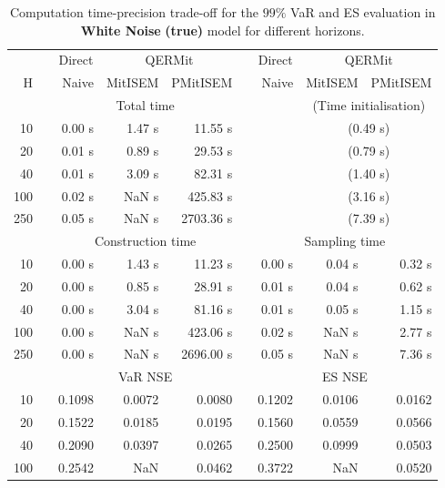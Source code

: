\footnotesize{  
{ \renewcommand{\arraystretch}{1.3} 
\begin{longtable}{rr rrr r rrr}  
\caption{Computation time-precision trade-off for the  $99\%$ VaR and ES evaluation in \textbf{White Noise} \textbf{(true)} model for different horizons.} 
\label{tab:time_precision_WN_ML} \\ 
 & & \multicolumn{1}{c}{Direct} & \multicolumn{2}{c}{QERMit}&  & \multicolumn{1}{c}{Direct} & \multicolumn{2}{c}{QERMit} \\ \cline{3-5} \cline{7-9} 
 H & & Naive & MitISEM & PMitISEM & & Naive & MitISEM & PMitISEM \\ \hline 
 & & \multicolumn{3}{c}{Total time} & & & \multicolumn{2}{c}{(Time initialisation)}  \\ \cline{3-5} \cline{8-9}
10 & & 0.00 s & 1.47 s & 11.55 s &&& \multicolumn{2}{c}{(0.49 s)} \\ 
20 & & 0.01 s & 0.89 s & 29.53 s &&& \multicolumn{2}{c}{(0.79 s)} \\ 
40 & & 0.01 s & 3.09 s & 82.31 s &&& \multicolumn{2}{c}{(1.40 s)} \\ 
100 & & 0.02 s &  NaN s & 425.83 s &&& \multicolumn{2}{c}{(3.16 s)} \\ 
250 & & 0.05 s &  NaN s & 2703.36 s &&& \multicolumn{2}{c}{(7.39 s)} \\ 
\hline 
 & & \multicolumn{3}{c}{Construction time} & & \multicolumn{3}{c}{ Sampling time} \\ \cline{3-5}  \cline{7-9}
10 & & 0.00 s & 1.43 s & 11.23 s &&  0.00 s & 0.04 s & 0.32 s \\ 
20 & & 0.00 s & 0.85 s & 28.91 s &&  0.01 s & 0.04 s & 0.62 s \\ 
40 & & 0.00 s & 3.04 s & 81.16 s &&  0.01 s & 0.05 s & 1.15 s \\ 
100 & & 0.00 s &  NaN s & 423.06 s &&  0.02 s &  NaN s & 2.77 s \\ 
250 & & 0.00 s &  NaN s & 2696.00 s &&  0.05 s &  NaN s & 7.36 s \\ 
\hline 
 & & \multicolumn{3}{c}{VaR NSE} &&  \multicolumn{3}{c}{ES NSE} \\ \cline{3-5}  \cline{7-9}
10 && 0.1098  & 0.0072  & 0.0080 && 0.1202  & 0.0106  & 0.0162  \\ 
20 && 0.1522  & 0.0185  & 0.0195 && 0.1560  & 0.0559  & 0.0566  \\ 
40 && 0.2090  & 0.0397  & 0.0265 && 0.2500  & 0.0999  & 0.0503  \\ 
100 && 0.2542  &    NaN  & 0.0462 && 0.3722  &    NaN  & 0.0520  \\ 

\end{longtable}}}
